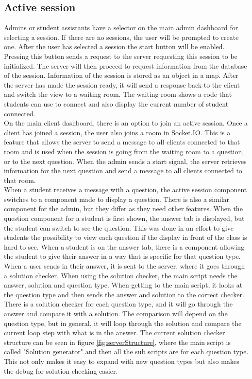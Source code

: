 \subsection{Active session}
Admins or student assistants have a selector on the main admin dashboard for selecting a session. If there are no sessions, the user will be prompted to create one. After the user has selected a session the start button will be enabled. Pressing this button sends a request to the server requesting this session to be initialized. The server will then proceed to request information from the database of the session. Information of the session is stored as an object in a map. After the server has made the session ready, it will send a response back to the client and switch the view to a waiting room. The waiting room shows a code that students can use to connect and also display the current number of student connected. 
\\[11pt]
On the main client dashboard, there is an option to join an active session. Once a client has joined a session, the user also joins a room in Socket.IO. This is a feature that allows the server to send a message to all clients connected to that room and is used when the session is going from the waiting room to a question, or to the next question. When the admin sends a start signal, the server retrieves information for the next question and send a message to all clients connected to that room.
\\[11pt]
When a student receives a message with a question, the active session component switches to a component made to display a question. There is also a similar component for the admin, but they differ as they need other features. When the question component for a student is first shown, the answer tab is displayed, but the student can switch to see the question. This was done in an effort to give students the possibility to view each question if the display in front of the class is hard to see. When a student is on the answer tab, there is a component allowing the student to give their answer in a way that is specific for that question type.
\\[11pt]
When a user sends in their answer, it is sent to the server, where it goes through a solution checker. When using the solution checker, the main script needs the answer, solution and question type. When getting to the main script, it looks at the question type and then sends the answer and solution to the correct checker. There is a solution checker for each question type, and it will go through the answer and compare it with a solution. The comparison will depend on the question type, but in general, it will loop through the solution and compare the current loop step with what is in the answer. The current solution checker structure can be seen in figure \ref{fig:serverStructure}, where the main script is called "Solution generator" and then all the sub scripts are for each question type. This not only makes it easy to expand with new question types but also makes the debug for solution checking easier.
